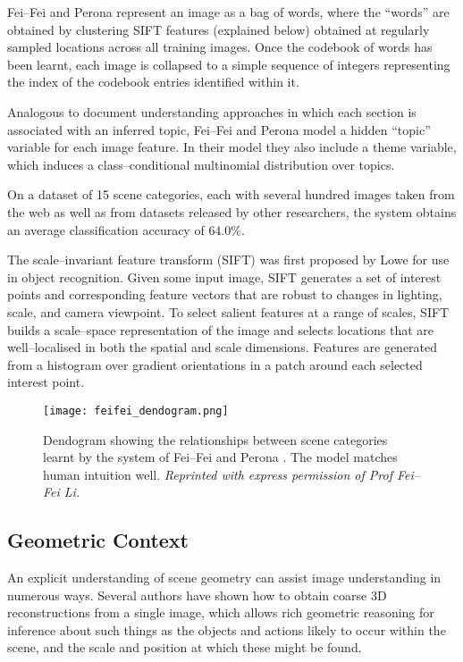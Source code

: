 Fei--Fei and Perona represent an image as a bag of words, where the
``words'' are obtained by clustering SIFT features (explained below)
obtained at regularly sampled locations across all training
images. Once the codebook of words has been learnt, each image is
collapsed to a simple sequence of integers representing the index of
the codebook entries identified within it.

Analogous to document understanding approaches in which each section
is associated with an inferred topic, Fei--Fei and Perona model a
hidden ``topic'' variable for each image feature. In their model they
also include a theme variable, which induces a class--conditional
multinomial distribution over topics.

On a dataset of 15 scene categories, each with several hundred images
taken from the web as well as from datasets released by other
researchers, the system obtains an average classification accuracy of
$64.0\%$.

The scale--invariant feature transform (SIFT) was first proposed by
Lowe \cite{Lowe99} for use in object recognition. Given some input
image, SIFT generates a set of interest points and corresponding
feature vectors that are robust to changes in lighting, scale, and
camera viewpoint. To select salient features at a range of scales, SIFT
builds a scale--space representation of the image \cite{Lindeberg93}
and selects locations that are well--localised in both the spatial and
scale dimensions. Features are generated from a histogram over
gradient orientations in a patch around each selected interest
point.

\begin{figure}[tb]
\centering
\texttt{[image: feifei\_dendogram.png]}
\caption{Dendogram showing the relationships between scene categories
  learnt by the system of Fei--Fei and Perona \cite{Fei-fei05}. The
  model matches human intuition well.
  \textit{Reprinted with express permission of Prof Fei--Fei Li.}
  }
\label{fig:dendogram}
\end{figure}

\subsection{Geometric Context}

An explicit understanding of scene geometry can assist image
understanding in numerous ways. Several authors have shown how to
obtain coarse 3D reconstructions from a single image, which allows
rich geometric reasoning for inference about such things as the
objects and actions likely to occur within the scene, and the scale
and position at which these might be found.


